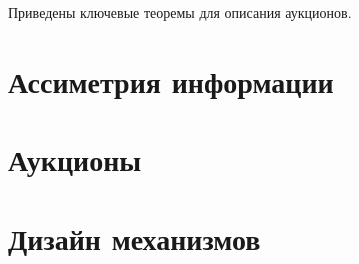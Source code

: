 Приведены ключевые теоремы для описания аукционов.



\section{Ассиметрия информации}


\section{Аукционы}


\section{Дизайн механизмов}
